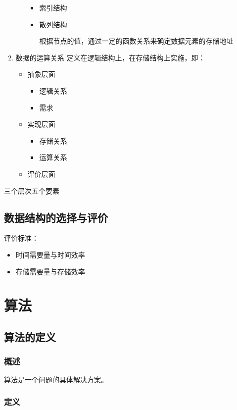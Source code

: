 \documentclass[AutoFakeBold]{LZUThesis2007}
\begin{document}
\begin{enumerate}
\begin{itemize}
\begin{itemize}
						\item  索引结构
						\item  散列结构

									根据节点的值，通过一定的函数关系来确定数据元素的存储地址

					\end{itemize}
			\end{itemize}
	\item 数据的运算关系
				定义在逻辑结构上，在存储结构上实施，即：
				\begin{itemize}
					\item  抽象层面
						\begin{itemize}
							\item 逻辑关系
							\item 需求
						\end{itemize}
					\item  实现层面
						\begin{itemize}
							\item 存储关系
							\item 运算关系
						\end{itemize}
					\item  评价层面
				\end{itemize}
\end{enumerate}

三个层次五个要素

	\section{数据结构的选择与评价}
		评价标准：
			\begin{itemize}
				\item 时间需要量与时间效率
				\item 存储需要量与存储效率
			\end{itemize}

\chapter{算法}
	\section{算法的定义}
		\subsection{概述}

			算法是一个问题的具体解决方案。

		\subsection{定义}
\end{document}
